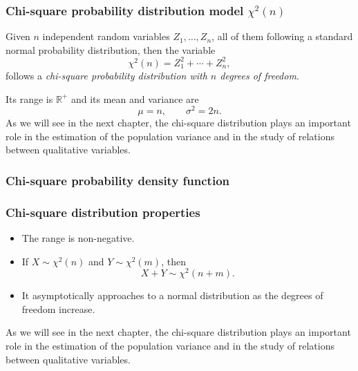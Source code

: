 \begin{frame}
\frametitle{Chi-square probability distribution model $\chi^2(n)$}
\begin{definition}
Given $n$ independent random variables $Z_1,\ldots,Z_n$, all of them following a standard normal probability distribution, then the variable
\[
\chi^2(n) = Z_1^2+\cdots +Z_n^2,
\]
follows a \emph{chi-square probability distribution with $n$ degrees of freedom}.
\end{definition}

Its range is $\mathbb{R}^+$ and its mean and variance are
\[
\mu = n, \qquad \sigma^2 = 2n.
\]
As we will see in the next chapter, the chi-square distribution plays an important role in the estimation of the population variance and in the study of relations between qualitative variables.
\end{frame}


\begin{frame}
\frametitle{Chi-square probability density function}

\begin{center}
\end{center}
\end{frame}


\begin{frame}
\frametitle{Chi-square distribution properties}
\begin{itemize}
\item The range is non-negative.
\item If $X\sim \chi^2(n)$ and $Y\sim \chi^2(m)$, then
\[
X+Y \sim \chi^2(n+m).
\]
\item It asymptotically approaches to a normal distribution as the degrees of freedom increase. 
\end{itemize}
As we will see in the next chapter, the chi-square distribution plays an important role in the estimation of the population variance and in the study of relations between qualitative variables.
\end{frame}


